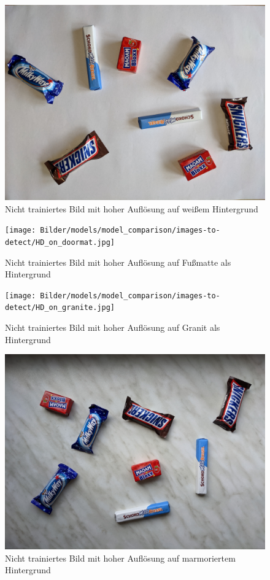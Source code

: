     \begin{figure}[H]
        \centering
        \includegraphics[angle = 90, width = \textwidth]{Bilder/models/model_comparison/images-to-detect/HD_on_white.jpg}
        \caption{Nicht trainiertes Bild mit hoher Auflösung auf weißem Hintergrund}
    \end{figure}
    
    \begin{figure}[H]
        \centering
        \texttt{[image: Bilder/models/model\_comparison/images-to-detect/HD\_on\_doormat.jpg]}
        \caption{Nicht trainiertes Bild mit hoher Auflösung auf Fußmatte als Hintergrund}
    \end{figure}
    
    \begin{figure}[H]
        \centering
        \texttt{[image: Bilder/models/model\_comparison/images-to-detect/HD\_on\_granite.jpg]}
        \caption{Nicht trainiertes Bild mit hoher Auflösung auf Granit als Hintergrund}
    \end{figure}
    
    \begin{figure}[H]
        \centering
        \includegraphics[angle = 90, width = \textwidth]{Bilder/models/model_comparison/images-to-detect/HD_on_marble.jpg}
        \caption{Nicht trainiertes Bild mit hoher Auflösung auf marmoriertem Hintergrund}
    \end{figure}
    
